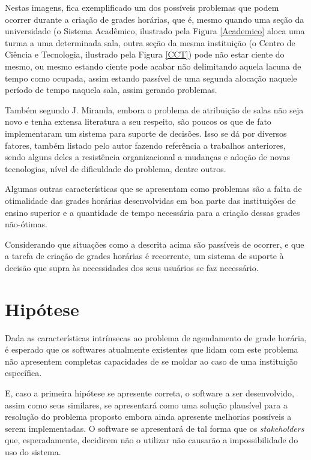 Nestas imagens, fica exemplificado um dos possíveis problemas que podem ocorrer durante a criação de grades horárias, que é, mesmo quando uma seção da universidade (o Sistema Acadêmico, ilustrado pela Figura \ref{Academico} aloca uma turma a uma determinada sala, outra seção da mesma instituição (o Centro de Ciência e Tecnologia, ilustrado pela Figura \ref{CCT}) pode não estar ciente do mesmo, ou mesmo estando ciente pode acabar não delimitando aquela lacuna de tempo como ocupada, assim estando passível de uma segunda alocação naquele período de tempo naquela sala, assim gerando problemas.

Também segundo J. Miranda, embora o problema de atribuição de salas não seja novo e tenha extensa literatura a seu respeito, são poucos os que de fato implementaram um sistema para suporte de decisões. Isso se dá por diversos fatores, também listado pelo autor fazendo referência a trabalhos anteriores, sendo alguns deles a resistência organizacional a mudanças e adoção de novas tecnologias, nível de dificuldade do problema, dentre outros.


Algumas outras características que se apresentam como problemas são a falta de otimalidade das grades horárias desenvolvidas em boa parte das instituições de ensino superior e a quantidade de tempo necessária para a criação dessas grades não-ótimas.

Considerando que situações como a descrita acima são passíveis de ocorrer, e que a tarefa de criação de grades horárias é recorrente, um sistema de suporte à decisão que supra às necessidades dos seus usuários se faz necessário.

\section{Hipótese} %

Dada as características intrínsecas ao problema de agendamento de grade horária, é esperado que os softwares atualmente existentes que lidam com este problema não apresentem completas capacidades de se moldar ao caso de uma instituição específica.

E, caso a primeira hipótese se apresente correta, o software a ser desenvolvido, assim como seus similares, se apresentará como uma solução plausível para a resolução do problema proposto embora ainda apresente melhorias possíveis a serem implementadas. O software se apresentará de tal forma que os \textit{stakeholders} que, esperadamente, decidirem não o utilizar não causarão a impossibilidade do uso do sistema.

